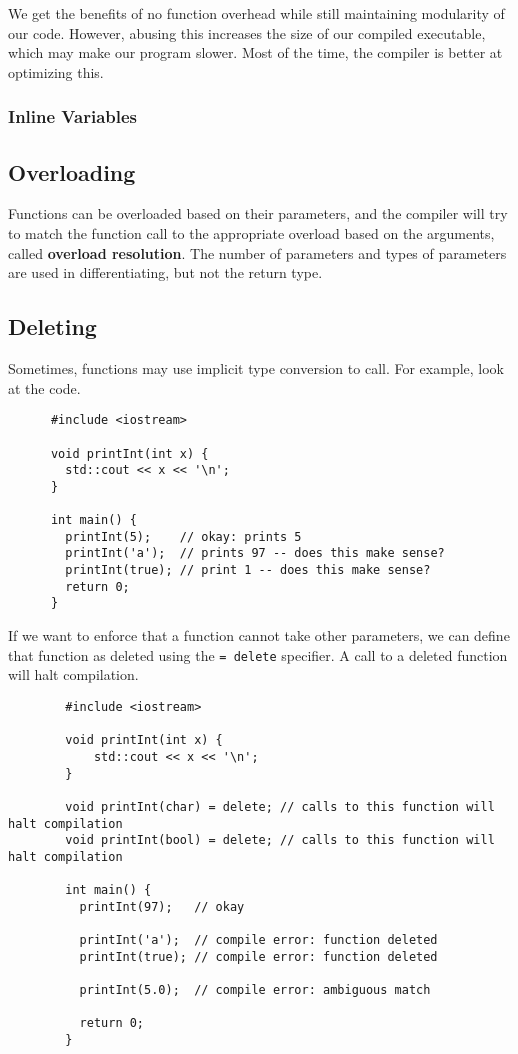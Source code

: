 \documentclass{article}
\begin{document}
    We get the benefits of no function overhead while still maintaining modularity of our code. However, abusing this increases the size of our compiled executable, which may make our program slower. Most of the time, the compiler is better at optimizing this.  

    \subsubsection{Inline Variables}

  \subsection{Overloading} 

    Functions can be overloaded based on their parameters, and the compiler will try to match the function call to the appropriate overload based on the arguments, called \textbf{overload resolution}. The number of parameters and types of parameters are used in differentiating, but not the return type. 

  \subsection{Deleting}

    Sometimes, functions may use implicit type conversion to call. For example, look at the code. 

    \begin{lstlisting}
      #include <iostream>

      void printInt(int x) {
        std::cout << x << '\n';
      }

      int main() {
        printInt(5);    // okay: prints 5
        printInt('a');  // prints 97 -- does this make sense?
        printInt(true); // print 1 -- does this make sense?
        return 0;
      }
    \end{lstlisting}

    \begin{definition}
      If we want to enforce that a function cannot take other parameters, we can define that function as deleted using the \texttt{= delete} specifier. A call to a deleted function will halt compilation. 
      \begin{lstlisting}
        #include <iostream>

        void printInt(int x) {
            std::cout << x << '\n';
        }

        void printInt(char) = delete; // calls to this function will halt compilation
        void printInt(bool) = delete; // calls to this function will halt compilation

        int main() {
          printInt(97);   // okay

          printInt('a');  // compile error: function deleted
          printInt(true); // compile error: function deleted

          printInt(5.0);  // compile error: ambiguous match

          return 0;
        } 
      \end{lstlisting}
    \end{definition}
\end{document}
